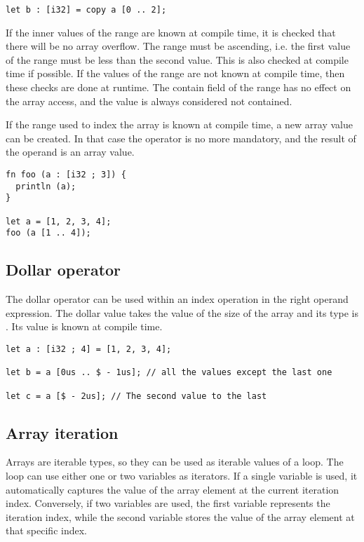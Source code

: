 \begin{itemize}
\begin{lstlisting}[style=coloredverbatim]
let b : [i32] = copy a [0 .. 2];
  \end{lstlisting}

  If the inner values of the range are known at compile time, it is checked that
  there will be no array overflow. The range must be ascending, i.e. the first
  value of the range must be less than the second value. This is also checked at
  compile time if possible. If the values of the range are not known at compile
  time, then these checks are done at runtime. The contain field of the range
  has no effect on the array access, and the  value is always
  considered not contained.

  If the range used to index the array is known at compile time, a new array
  value can be created. In that case the  operator is no more
  mandatory, and the result of the operand is an array value.

  \begin{lstlisting}[style=coloredverbatim]
fn foo (a : [i32 ; 3]) {
  println (a);
}

let a = [1, 2, 3, 4];
foo (a [1 .. 4]);
  \end{lstlisting}

\end{itemize}

\subsection {Dollar operator}

The dollar operator can be used within an index operation in the right operand
expression. The dollar value takes the value of the size of the array and its
type is . Its value is known at compile time.

\begin{lstlisting}[style=coloredverbatim]
let a : [i32 ; 4] = [1, 2, 3, 4];

let b = a [0us .. $ - 1us]; // all the values except the last one

let c = a [$ - 2us]; // The second value to the last
\end{lstlisting}

\subsection {Array iteration}

Arrays are iterable types, so they can be used as iterable values of a
 loop. The  loop can use either one or two variables as
iterators. If a single variable is used, it automatically captures the value of
the array element at the current iteration index. Conversely, if two variables
are used, the first variable represents the iteration index, while the second
variable stores the value of the array element at that specific index.


